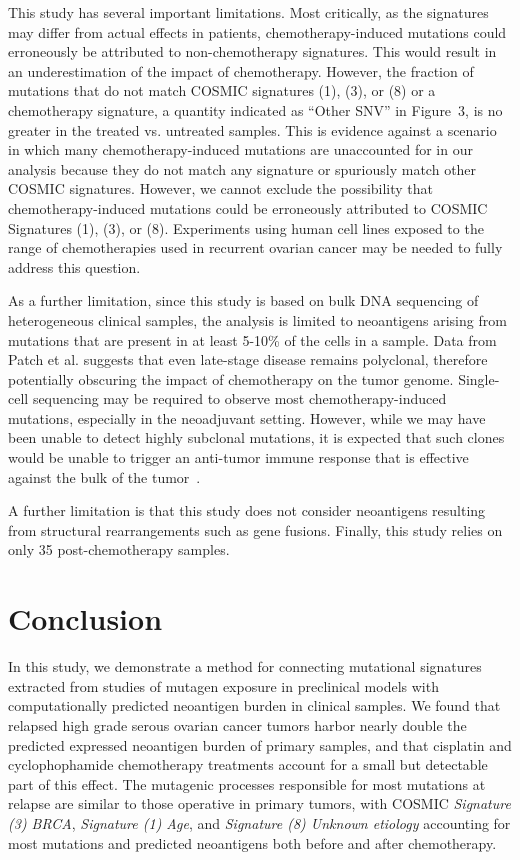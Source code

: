 \documentclass[linenumbers]{bmcart}
\begin{document}
This study has several important limitations. Most critically, as the signatures may differ from actual effects in patients, chemotherapy-induced mutations could erroneously be attributed to non-chemotherapy signatures. This would result in an underestimation of the impact of chemotherapy. However, the fraction of mutations that do not match COSMIC signatures (1), (3), or (8) or a chemotherapy signature, a quantity indicated as ``Other SNV'' in Figure~3, is no greater in the treated vs. untreated samples. This is evidence against a scenario in which many chemotherapy-induced mutations are unaccounted for in our analysis because they do not match any signature or spuriously match other COSMIC signatures. However, we cannot exclude the possibility that chemotherapy-induced mutations could be erroneously attributed to COSMIC Signatures (1), (3), or (8). Experiments using human cell lines exposed to the range of chemotherapies used in recurrent ovarian cancer may be needed to fully address this question.

As a further limitation, since this study is based on bulk DNA sequencing of heterogeneous clinical samples, the analysis is limited to neoantigens arising from mutations that are present in at least 5-10\% of the cells in a sample. Data from Patch et al. suggests that even late-stage disease remains polyclonal, therefore potentially obscuring the impact of chemotherapy on the tumor genome. Single-cell sequencing may be required to observe most chemotherapy-induced mutations, especially in the neoadjuvant setting. However, while we may have been unable to detect highly subclonal mutations, it is expected that such clones would be unable to trigger an anti-tumor immune response that is effective against the bulk of the tumor~\cite{McGranahan_2016}. 

A further limitation is that this study does not consider neoantigens resulting from structural rearrangements such as gene fusions. Finally, this study relies on only 35 post-chemotherapy samples.


\section*{Conclusion}
In this study, we demonstrate a method for connecting mutational signatures extracted from studies of mutagen exposure in preclinical models with computationally predicted neoantigen burden in clinical samples. We found that relapsed high grade serous ovarian cancer tumors harbor nearly double the predicted expressed neoantigen burden of primary samples, and that cisplatin and cyclophophamide chemotherapy treatments account for a small but detectable part of this effect. The mutagenic processes responsible for most mutations at relapse are similar to those operative in primary tumors, with COSMIC \textit{Signature (3) BRCA}, \textit{Signature (1) Age}, and \textit{Signature (8) Unknown etiology} accounting for most mutations and predicted neoantigens both before and after chemotherapy.
\end{document}
